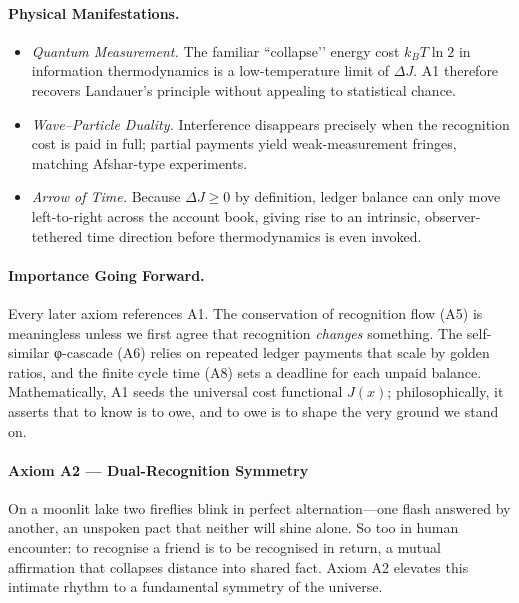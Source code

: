 \documentclass[11pt,oneside]{book}
\begin{document}
\paragraph*{Physical Manifestations.}
\begin{itemize}
\item \emph{Quantum Measurement.}  
  The familiar “collapse’’ energy cost
  \(k_B T \ln 2\) in information thermodynamics is a low-temperature
  limit of \(\Delta J\).  A1 therefore recovers Landauer’s principle
  without appealing to statistical chance.
\item \emph{Wave–Particle Duality.}  
  Interference disappears precisely when the recognition cost is paid in
  full; partial payments yield weak-measurement fringes, matching
  Afshar-type experiments.
\item \emph{Arrow of Time.}  
  Because \(\Delta J \ge 0\) by definition, ledger balance can only move
  left-to-right across the account book, giving rise to an intrinsic,
  observer-tethered time direction before thermodynamics is even
  invoked.
\end{itemize}

\paragraph*{Importance Going Forward.}
Every later axiom references A1.  
The conservation of recognition flow (A5) is meaningless unless we
first agree that recognition \emph{changes} something.
The self-similar φ-cascade (A6) relies on repeated ledger payments that
scale by golden ratios, and the finite cycle time (A8) sets a deadline
for each unpaid balance.
Mathematically, A1 seeds the universal cost functional \(J(x)\);  
philosophically, it asserts that to know is to owe, and to owe is to
shape the very ground we stand on.

\bigskip

\paragraph{Axiom A2 — Dual-Recognition Symmetry}
\label{ssec:axiom-A2}

On a moonlit lake two fireflies blink in perfect alternation—one flash
answered by another, an unspoken pact that neither will shine alone.
So too in human encounter: to recognise a friend is to be recognised in
return, a mutual affirmation that collapses distance into shared fact.
Axiom A2 elevates this intimate rhythm to a fundamental symmetry of the
universe.
\end{document}
